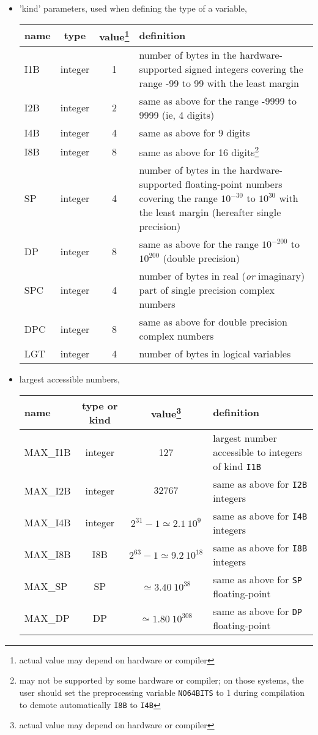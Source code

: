 \begin{itemize}
\item
'kind' parameters, used when defining the type of a variable,

\begin{mytable}{%
\begin{tabularx}{\linewidth}{lcc X}
name & type & value\footnote{actual value may depend on hardware or compiler} & definition \\
\hline
I1B & integer & 1 & number of bytes in the hardware-supported signed integers covering the range -99 to
99 with the least margin\\
I2B & integer & 2 & same as above for the range -9999 to 9999 (ie, 4 digits)\\
I4B & integer & 4 & same as above for 9 digits \\
I8B & integer & 8 & same as above for 16 digits\footnote{may not be supported by
  some hardware or compiler; on those systems, the user should set the
preprocessing variable {\tt NO64BITS} to 1 during compilation to demote
automatically {\tt I8B} to {\tt I4B}} \\
SP & integer & 4 & number of bytes in the hardware-supported floating-point
numbers covering the range $10^{-30}$ to $10^{30}$ with the least margin
(hereafter single precision)\\
DP & integer & 8 & same as above for the range $10^{-200}$ to $10^{200}$
(double precision)\\
SPC & integer & 4 & number of bytes in real ({\em or} imaginary) part of single precision complex numbers\\
DPC & integer & 8 & same as above for double precision complex numbers\\
LGT & integer & 4 & number of bytes in logical variables \\
\hline
\end{tabularx}
}%
\end{mytable}


\item
largest accessible numbers,

\begin{mytable}{%
\begin{tabularx}{\linewidth}{lcc X}
name & type or kind & value\footnote{actual value may depend on hardware or compiler} & definition \\
\hline
MAX\_I1B & integer & 127 & largest number accessible to integers of kind {\tt I1B}\\
MAX\_I2B & integer & $32767$ &
same as above for {\tt I2B} integers\\
MAX\_I4B & integer & $2^{31}-1 \simeq 2.1\ 10^9$& same as above for {\tt I4B} integers \\
MAX\_I8B & I8B & $2^{63}-1 \simeq 9.2\ 10^{18}$& same as above for {\tt I8B} integers \\
MAX\_SP & SP & $\simeq 3.40\ 10^{38}$ & same as above for {\tt SP} floating-point\\
MAX\_DP & DP & $\simeq 1.80\ 10^{308}$ & same as above for {\tt DP} floating-point\\
\hline
\end{tabularx}
}
\end{mytable}


\end{itemize}
